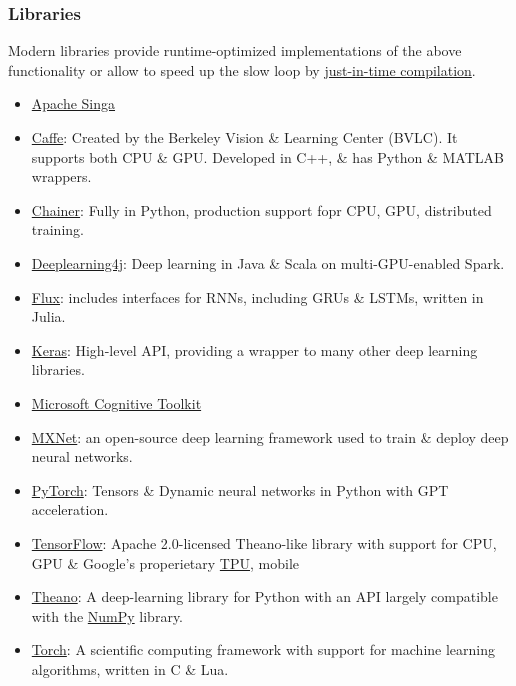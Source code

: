 \documentclass{article}
\begin{document}
\subsubsection{Libraries}
Modern libraries provide runtime-optimized implementations of the above functionality or allow to speed up the slow loop by \href{https://en.wikipedia.org/wiki/Just-in-time_compilation}{just-in-time compilation}.
\begin{itemize}
	\item \href{https://en.wikipedia.org/wiki/Apache_Singa}{Apache Singa}
	\item \href{https://en.wikipedia.org/wiki/Caffe_(software)}{Caffe}: Created by the Berkeley Vision \& Learning Center (BVLC). It supports both CPU \& GPU. Developed in C++, \& has Python \& MATLAB wrappers.
	\item \href{https://en.wikipedia.org/wiki/Chainer}{Chainer}: Fully in Python, production support fopr CPU, GPU, distributed training.
	\item \href{https://en.wikipedia.org/wiki/Deeplearning4j}{Deeplearning4j}: Deep learning in Java \& Scala on multi-GPU-enabled Spark.
	\item \href{https://en.wikipedia.org/wiki/Flux_(machine-learning_framework)}{Flux}: includes interfaces for RNNs, including GRUs \& LSTMs, written in Julia.
	\item \href{https://en.wikipedia.org/wiki/Keras}{Keras}: High-level API, providing a wrapper to many other deep learning libraries.
	\item \href{https://en.wikipedia.org/wiki/Microsoft_Cognitive_Toolkit}{Microsoft Cognitive Toolkit}
	\item \href{https://en.wikipedia.org/wiki/MXNet}{MXNet}: an open-source deep learning framework used to train \& deploy deep neural networks.
	\item \href{https://en.wikipedia.org/wiki/PyTorch}{PyTorch}: Tensors \& Dynamic neural networks in Python with GPT acceleration.
	\item \href{https://en.wikipedia.org/wiki/TensorFlow}{TensorFlow}: Apache 2.0-licensed Theano-like library with support for CPU, GPU \& Google's properietary \href{https://en.wikipedia.org/wiki/Tensor_processing_unit}{TPU}, mobile
	\item \href{https://en.wikipedia.org/wiki/Theano_(software)}{Theano}: A deep-learning library for Python with an API largely compatible with the \href{https://en.wikipedia.org/wiki/NumPy}{NumPy} library.
	\item \href{https://en.wikipedia.org/wiki/Torch_(machine_learning)}{Torch}: A scientific computing framework with support for machine learning algorithms, written in C \& Lua.
\end{itemize}
\end{document}
